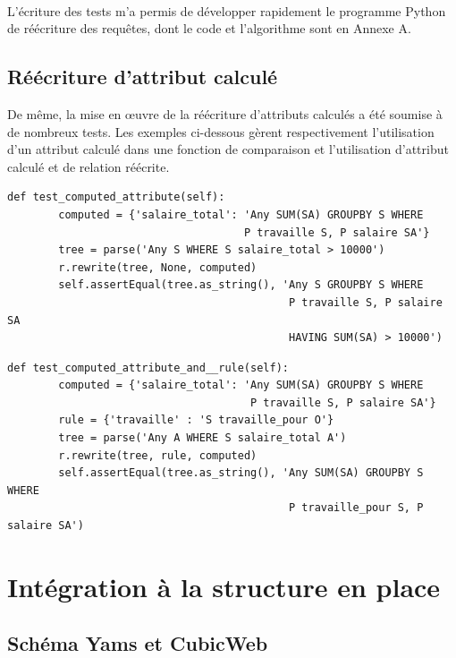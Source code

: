 \documentclass {report}
\begin{document}
\paragraph{}
L'écriture des tests m'a permis de développer rapidement le programme Python de réécriture des requêtes, dont le code et l'algorithme sont en Annexe A.

\subsection{Réécriture d'attribut calculé}
De même, la mise en œuvre de la réécriture d'attributs calculés a été soumise à de nombreux tests. Les exemples ci-dessous gèrent respectivement l'utilisation d'un attribut calculé dans une fonction de comparaison et l'utilisation d'attribut calculé et de relation réécrite.

\renewcommand{\lstlistingname}{Test}
\begin{lstlisting}[caption= Attribut calculé et fonction de comparaison]
def test_computed_attribute(self):
        computed = {'salaire_total': 'Any SUM(SA) GROUPBY S WHERE
                                     P travaille S, P salaire SA'}
        tree = parse('Any S WHERE S salaire_total > 10000')
        r.rewrite(tree, None, computed)
        self.assertEqual(tree.as_string(), 'Any S GROUPBY S WHERE
                                            P travaille S, P salaire SA
                                            HAVING SUM(SA) > 10000')
\end{lstlisting}

\begin{lstlisting}[caption= Attribut calculé et réécriture de relation]
    def test_computed_attribute_and__rule(self):
        computed = {'salaire_total': 'Any SUM(SA) GROUPBY S WHERE
                                      P travaille S, P salaire SA'}
        rule = {'travaille' : 'S travaille_pour O'}
        tree = parse('Any A WHERE S salaire_total A')
        r.rewrite(tree, rule, computed)
        self.assertEqual(tree.as_string(), 'Any SUM(SA) GROUPBY S WHERE
                                            P travaille_pour S, P salaire SA')
\end{lstlisting}

\section{Intégration à la structure en place}

\subsection{Schéma Yams et CubicWeb}
\end{document}

